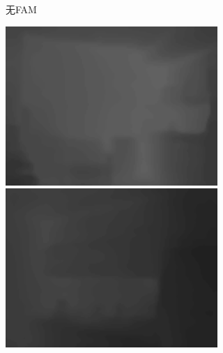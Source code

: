 \begin{figure}[htb]
\begin{subfigure}{0.24\linewidth}
\begin{minipage}[b]{1\linewidth}
  \end{minipage}
  \caption{无FAM}
  \end{subfigure}
  \begin{subfigure}{0.24\linewidth}
  \begin{minipage}[b]{1\linewidth}
  \includegraphics[width=1\linewidth]{figure/FAM/00000_colors.png}\vspace{4pt}
  \includegraphics[width=1\linewidth]{figure/FAM/00001_colors.png}\vspace{4pt}

\end{minipage}
\end{subfigure}
\end{figure}
